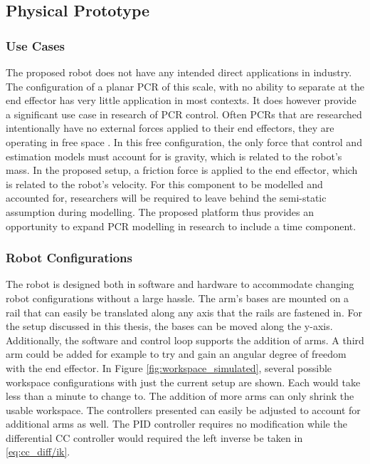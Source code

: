 \subsection{Physical Prototype}
\subsubsection{Use Cases}
The proposed robot does not have any intended direct applications in industry. The configuration of a planar PCR of this scale, with no ability to separate at the end effector has very little application in most contexts. It does however provide a significant use case in research of PCR control. Often PCRs that are researched intentionally have no external forces applied to their end effectors, they are operating in free space \cite{survey}. In this free configuration, the only force that control and estimation models must account for is gravity, which is related to the robot's mass. In the proposed setup, a friction force is applied to the end effector, which is related to the robot's velocity. For this component to be modelled and accounted for, researchers will be required to leave behind the semi-static assumption during modelling. The proposed platform thus provides an opportunity to expand PCR modelling in research to include a time component. 


\subsubsection{Robot Configurations}
The robot is designed both in software and hardware to accommodate changing robot configurations without a large hassle. The arm's bases are mounted on a rail that can easily be translated along any axis that the rails are fastened in. For the setup discussed in this thesis, the bases can be moved along the y-axis. Additionally, the software and control loop supports the addition of arms. A third arm could be added for example to try and gain an angular degree of freedom with the end effector. In Figure \ref{fig:workspace_simulated}, several possible workspace configurations with just the current setup are shown. Each would take less than a minute to change to. The addition of more arms can only shrink the usable workspace. The controllers presented can easily be adjusted to account for additional arms as well. The PID controller requires no modification while the differential CC controller would required the left inverse be taken in \eqref{eq:cc_diff/ik}. 

